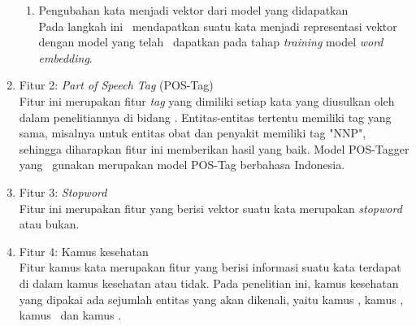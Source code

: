 \begin{enumerate}
\begin{enumerate}
		\item Pengubahan kata menjadi vektor dari model yang didapatkan\\
		Pada langkah ini \saya~mendapatkan suatu kata menjadi representasi vektor dengan model yang telah \saya~dapatkan pada tahap \textit{training} model \textit{word embedding}.
	\end{enumerate}
	
	\item Fitur 2: \textit{Part of Speech Tag} (POS-Tag)\\
	Fitur ini merupakan fitur \textit{tag} yang dimiliki setiap kata yang diusulkan oleh \cite{abacha2011medical} dalam penelitiannya di bidang \mer. Entitas-entitas tertentu memiliki tag yang sama, misalnya untuk entitas obat dan penyakit memiliki tag "NNP", sehingga diharapkan fitur ini memberikan hasil yang baik. Model POS-Tagger yang \saya~gunakan merupakan model POS-Tag berbahasa Indonesia.
	
	\item Fitur 3: \textit{Stopword}\\
	Fitur ini merupakan fitur yang berisi vektor suatu kata merupakan \textit{stopword} atau bukan.
	
	\item Fitur 4: Kamus kesehatan\\
	Fitur kamus kata merupakan fitur yang berisi informasi suatu kata terdapat di dalam kamus kesehatan atau tidak. Pada penelitian ini, kamus kesehatan yang dipakai ada sejumlah entitas yang akan dikenali, yaitu kamus \disease, kamus \symptom, kamus \drug~dan kamus \treatment.\
	

\end{enumerate}
